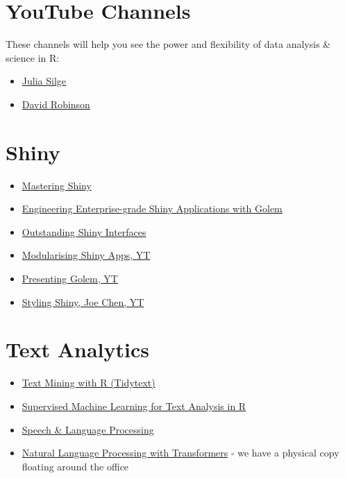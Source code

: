 \documentclass[
  letterpaper,
  DIV=11,
  numbers=noendperiod]{scrreprt}
\providecommand{\tightlist}{%
  \setlength{\itemsep}{0pt}\setlength{\parskip}{0pt}}\usepackage{longtable,booktabs,array}
\begin{document}
\section{YouTube Channels}\label{youtube-channels}

These channels will help you see the power and flexibility of data
analysis \& science in R:

\begin{itemize}
\tightlist
\item
  \href{https://www.youtube.com/@JuliaSilge}{Julia Silge}
\item
  \href{https://www.youtube.com/user/safe4democracy/videos}{David
  Robinson}
\end{itemize}

\section{Shiny}\label{shiny}

\begin{itemize}
\tightlist
\item
  \href{https://mastering-shiny.org/}{Mastering Shiny}
\item
  \href{https://engineering-shiny.org/foreword.html}{Engineering
  Enterprise-grade Shiny Applications with Golem}
\item
  \href{https://unleash-shiny.rinterface.com/}{Outstanding Shiny
  Interfaces}
\item
  \href{https://www.youtube.com/watch?v=oOYaHsPXLvs}{Modularising Shiny
  Apps, YT}
\item
  \href{https://www.youtube.com/watch?v=SE6TnUV4nC4&ab_channel=PositPBC}{Presenting
  Golem, YT}
\item
  \href{https://www.youtube.com/watch?v=GHBwprI_Py4}{Styling Shiny, Joe
  Chen, YT}
\end{itemize}

\section{Text Analytics}\label{text-analytics}

\begin{itemize}
\tightlist
\item
  \href{https://www.tidytextmining.com/}{Text Mining with R (Tidytext)}
\item
  \href{https://smltar.com/}{Supervised Machine Learning for Text
  Analysis in R}
\item
  \href{https://web.stanford.edu/~jurafsky/slp3/ed3book.pdf}{Speech \&
  Language Processing}
\item
  \href{https://github.com/nlp-with-transformers/notebooks}{Natural
  Language Processing with Transformers} - we have a physical copy
  floating around the office
\end{itemize}
\end{document}
